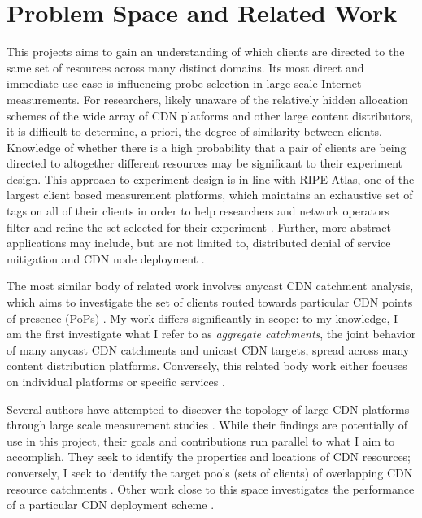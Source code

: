 \section{Problem Space and Related Work} \label{skyspace}

This projects aims to gain an understanding of which clients are directed to the same set of
resources across many distinct domains. Its most direct and immediate use case is influencing probe
selection in large scale Internet measurements. For researchers, likely unaware of the relatively
hidden allocation schemes of the wide array of CDN platforms and other large content distributors,
it is difficult to determine, a priori, the degree of similarity between clients. Knowledge of
whether there is a high probability that a pair of clients are being directed to altogether
different resources may be significant to their experiment design. This approach to experiment
design is in line with RIPE Atlas, one of the largest client based measurement platforms,
which maintains
an exhaustive set of tags on all of their clients in order to help researchers and network operators
filter and refine the set selected for their experiment \cite{ripe-atlas}. Further, more abstract
applications may include, but are not limited to, distributed denial of service mitigation
\cite{anycastvsddos} and CDN node deployment \cite{35590, Tariq}.

The most similar body of related work involves anycast CDN catchment analysis, which aims to
investigate the set of clients routed towards particular CDN points of presence (PoPs)
\cite{Calder2015, anycastvsddos, vdmscatchment}. My work differs significantly in scope: to my
knowledge, I am the first investigate what I refer to as \emph{aggregate catchments}, the joint
behavior of many anycast CDN catchments and unicast CDN targets, spread across many content
distribution platforms. Conversely, this related body work either focuses on individual platforms or
specific services \cite{Calder2015, anycastvsddos, vdmscatchment}. 

Several authors have attempted to discover the topology of large CDN platforms through large scale
measurement studies \cite{webcart, Calder2013, benson11}. While their findings are potentially of
use in this project, their goals and contributions run parallel to what I aim to accomplish. They
seek to identify the properties and locations of CDN resources; conversely, I seek to identify the
target pools (sets of clients) of overlapping CDN resource catchments \cite{webcart, Calder2013,
benson11}. Other work close to this space investigates the performance of a particular CDN
deployment scheme \cite{ecs15sigcomm}.
